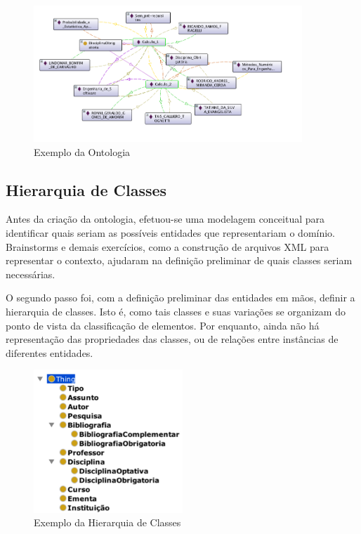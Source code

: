 	
\begin{figure}[H]
	\centering
	\includegraphics[width=0.9\textwidth]{imagens/ontologia}
	\caption{Exemplo da Ontologia}
	\label{img:ontologia}
\end{figure}

\subsection{Hierarquia de Classes} %
\label{sub:hierarquia_de_classes}

	Antes da criação da ontologia, efetuou-se uma modelagem conceitual para identificar quais seriam as possíveis entidades que representariam o domínio. Brainstorms e demais exercícios, como a construção de arquivos XML para representar o contexto, ajudaram na definição preliminar de quais classes seriam necessárias.
	
	O segundo passo foi, com a definição preliminar das entidades em mãos, definir a hierarquia de classes. Isto é, como tais classes e suas variações se organizam do ponto de vista da classificação de elementos. Por enquanto, ainda não há representação das propriedades das classes, ou de relações entre instâncias de diferentes entidades.

\begin{figure}[H]
	\centering
	\includegraphics[width=0.5\textwidth]{imagens/hierarquia}
	\caption{Exemplo da Hierarquia de Classes}
	\label{img:hierarquia}
\end{figure}

